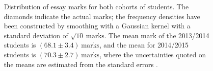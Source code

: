 \begin{figure}
  \centering
    \quad
\caption{Distribution of essay marks for both cohorts of students. The diamonds indicate the actual marks; the frequency densities have been constructed by smoothing with a Gaussian kernel with a standard deviation of $\sqrt{10}~\mathrm{marks}$. The mean mark of the 2013/2014 students is $(68.1\pm3.4)~\mathrm{marks}$, and the mean for 2014/2015 students is $(70.3\pm2.7)~\mathrm{marks}$, where the uncertainties quoted on the means are estimated from the standard errors \citep[chapter 22]{Mackay2003}.}
  \label{fig:marks}
\end{figure}

